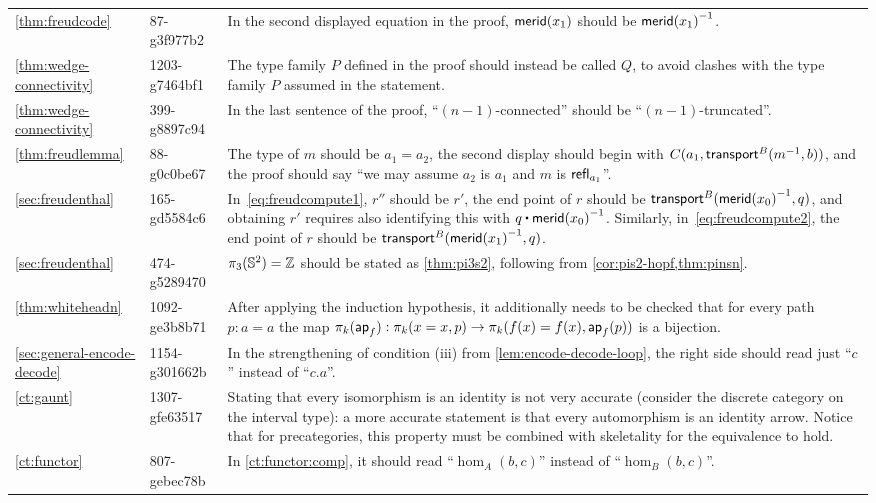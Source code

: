 \documentclass[
%
%
11pt %
]{article}
\begin{document}
\begin{longtable}{llp{10.5cm}}
  \cref{thm:freudcode}
  & 87-g3f977b2
  & In the second displayed equation in the proof, $\mathsf{merid}(x_1)$ should be $\mathord{{\mathsf{merid}(x_1)}^{-1}}$.\\
  \cref{thm:wedge-connectivity}
  & 1203-g7464bf1
  & The type family $P$ defined in the proof should instead be called $Q$, to avoid clashes with the type family $P$ assumed in the statement.\\
  \cref{thm:wedge-connectivity}
  & 399-g8897c94
  & In the last sentence of the proof, ``$(n-1)$-connected'' should be ``$(n-1)$-truncated''.\\
  \cref{thm:freudlemma}
  & 88-g0c0be67
  & The type of $m$ should be $a_1=a_2$, the second display should begin with $C(a_1,\mathsf{transport}^{B}(\mathord{{m}^{-1}},b))$, and the proof should say ``we may assume $a_2$ is $a_1$ and $m$ is $\mathsf{refl}_{a_1}$''.\\
  \cref{sec:freudenthal}
  & 165-gd5584c6
  & In~\eqref{eq:freudcompute1}, $r''$ should be $r'$, the end point of $r$ should be $\mathsf{transport}^{B}(\mathord{{\mathsf{merid}(x_0)}^{-1}},q)$, and obtaining $r'$ requires also identifying this with $q \ct \opp{\merid(x_0)}$.
  Similarly, in~\eqref{eq:freudcompute2}, the end point of $r$ should be $\mathsf{transport}^{B}(\mathord{{\mathsf{merid}(x_1)}^{-1}},q)$.\\
  \cref{sec:freudenthal}
  & 474-g5289470
  & $\pi_3(\mathbb{S}^2)=\mathbb{Z}$ should be stated as \cref{thm:pi3s2}, following from \cref{cor:pis2-hopf,thm:pinsn}.\\
  \cref{thm:whiteheadn}
  & 1092-ge3b8b71
  & After applying the induction hypothesis, it additionally needs to be checked that for every path $p : a = a$ the map $\pi_k(\mathsf{ap}_{f}):\pi_k(x = x,p) \to \pi_k(f(x) = f(x),\mathsf{ap}_{f}(p))$ is a bijection. \\
  \cref{sec:general-encode-decode}
  & 1154-g301662b
  & In the strengthening of condition (iii) from \cref{lem:encode-decode-loop}, the right side should read just ``$c$'' instead of ``$c.a$''.\\
  \cref{ct:gaunt}
  & 1307-gfe63517
  & Stating that every isomorphism is an identity is not very accurate (consider the discrete category on the interval type): a more accurate statement is that every automorphism is an identity arrow. Notice that for precategories, this property must be combined with skeletality for the equivalence to hold.\\
  \cref{ct:functor}
  & 807-gebec78b
  & In \cref{ct:functor:comp}, it should read ``$\hom_A(b,c)$'' instead of ``$\hom_B(b,c)$''.\\

\end{longtable}
\end{document}
